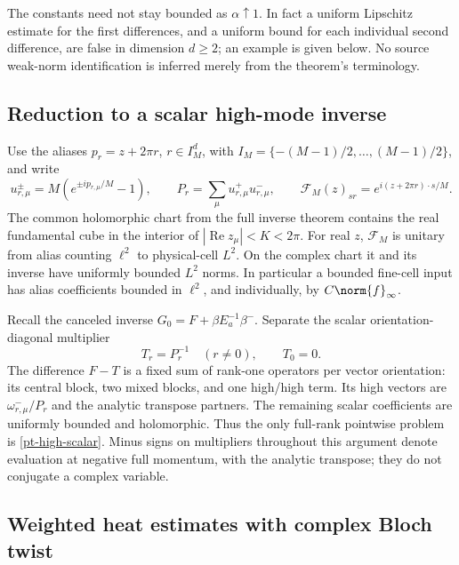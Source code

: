 The constants need not stay bounded as $\alpha\uparrow1$. In fact a
uniform Lipschitz estimate for the first differences, and a uniform
bound for each individual second difference, are false in dimension
$d\ge2$; an example is given below. No source weak-norm identification
is inferred merely from the theorem's terminology.

\subsection{Reduction to a scalar high-mode inverse}

Use the aliases $p_r=z+2\pi r$, $r\in I_M^d$, with
$I_M=\{-(M-1)/2,\ldots,(M-1)/2\}$, and write
\begin{equation}\label{pt-alias-data}
 u_{r,\mu}^{\pm}=M(e^{\pm ip_{r,\mu}/M}-1),\qquad
 P_r=\sum_\mu u_{r,\mu}^+u_{r,\mu}^-,\qquad
 \mathcal F_M(z)_{sr}=e^{i(z+2\pi r)\cdot s/M}.
\end{equation}
The common holomorphic chart from the full inverse theorem contains
the real fundamental cube in the interior of $|\operatorname{Re}z_\mu|<K<2\pi$.
For real $z$, $\mathcal F_M$ is unitary from alias counting $\ell^2$
to physical-cell $L^2$. On the complex chart it and its inverse have
uniformly bounded $L^2$ norms. In particular a bounded fine-cell input
has alias coefficients bounded in $\ell^2$, and individually, by
$C\norm{f}_\infty$.

Recall the canceled inverse $G_0=F+\beta E_a^{-1}\beta^-$.
Separate the scalar orientation-diagonal multiplier
\begin{equation}\label{pt-high-scalar}
 T_r=P_r^{-1}\quad(r\ne0),\qquad T_0=0.
\end{equation}
The difference $F-T$ is a fixed sum of rank-one operators per vector
orientation: its central block, two mixed blocks, and one high/high
term. Its high vectors are $\omega_{r,\mu}^-/P_r$ and the analytic
transpose partners. The remaining scalar coefficients are uniformly
bounded and holomorphic. Thus the only full-rank pointwise problem is
\eqref{pt-high-scalar}. Minus signs on multipliers throughout this
argument denote evaluation at negative full momentum, with the
analytic transpose; they do not conjugate a complex variable.

\subsection{Weighted heat estimates with complex Bloch twist}

